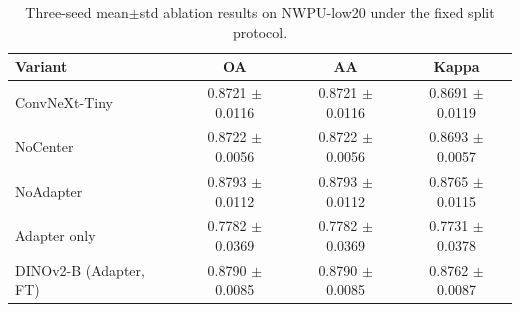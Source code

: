 \begin{table}[t]
  \centering
  \caption{Three-seed mean$\pm$std ablation results on NWPU-low20 under the fixed split protocol.}
  \label{tab:nwpu-low20_ablation}
  \begin{tabular}{l c c c}
    \toprule
    Variant & OA & AA & Kappa \\
    \midrule
    ConvNeXt-Tiny & 0.8721 $\pm$ 0.0116 & 0.8721 $\pm$ 0.0116 & 0.8691 $\pm$ 0.0119 \\
    NoCenter & 0.8722 $\pm$ 0.0056 & 0.8722 $\pm$ 0.0056 & 0.8693 $\pm$ 0.0057 \\
    NoAdapter & 0.8793 $\pm$ 0.0112 & 0.8793 $\pm$ 0.0112 & 0.8765 $\pm$ 0.0115 \\
    Adapter only & 0.7782 $\pm$ 0.0369 & 0.7782 $\pm$ 0.0369 & 0.7731 $\pm$ 0.0378 \\
    DINOv2-B (Adapter, FT) & 0.8790 $\pm$ 0.0085 & 0.8790 $\pm$ 0.0085 & 0.8762 $\pm$ 0.0087 \\
    \bottomrule
  \end{tabular}
\end{table}
